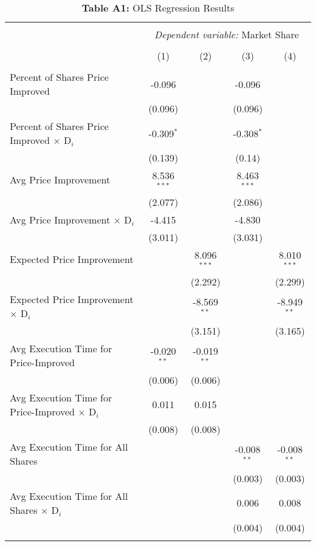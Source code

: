 \documentclass[12pt,a4paper]{extarticle}
\begin{document}
\begin{table}[h] 
	\caption*{\textbf{Table A1:} OLS Regression Results}
	\label{table:a1} 
	\centering
	\footnotesize
	\begin{tabular}{@{\extracolsep{1.39em}}lcccc} 
		\\[-4ex]\hline 
		\hline \\[-2ex] 
		& \multicolumn{4}{c}{\textit{Dependent variable: }Market Share} \\ 
		\cline{2-5} \\[-2ex]
		& (1) & (2) & (3) & (4) \\[.4ex]  
		\hline \\[-1.8ex] 
		Percent of Shares Price Improved & -0.096 &  & -0.096 & \\
		& (0.096) &  & (0.096) & \\ [0.5ex]
		Percent of Shares Price Improved $\times$ D$_i$ & -0.309$^{*}$ &  & -0.308$^{*}$ & \\
		& (0.139) &  & (0.14) & \\ [0.5ex]
		Avg Price Improvement & 8.536$^{***}$ &  & 8.463$^{***}$ & \\
		& (2.077) &  & (2.086) & \\ [0.5ex]
		Avg Price Improvement $\times$ D$_i$ & -4.415 &  & -4.830 & \\
		& (3.011) &  & (3.031) & \\ [0.5ex]
		Expected Price Improvement &  & 8.096$^{***}$ &  & 8.010$^{***}$\\
		&  & (2.292) &  & (2.299)\\ [0.5ex]
		Expected Price Improvement $\times$ D$_i$  &  & -8.569$^{**}$ &  & -8.949$^{**}$\\
		&  & (3.151) &  & (3.165)\\ [0.5ex]
		Avg Execution Time for Price-Improved & -0.020$^{**}$ & -0.019$^{**}$ &  & \\
		& (0.006) & (0.006) &  & \\ [0.5ex]
		Avg Execution Time for Price-Improved  $\times$ D$_i$  & 0.011 & 0.015 &  & \\
		& (0.008) & (0.008) &  & \\ [0.5ex]
		Avg Execution Time for All Shares &  &  & -0.008$^{**}$ & -0.008$^{**}$\\
		&  &  & (0.003) & (0.003)\\ [0.5ex]
		Avg Execution Time for All Shares  $\times$ D$_i$  &  &  & 0.006 & 0.008\\
		&  &  & (0.004) & (0.004)\\ [0.5ex]
		\hline \\[-1.8ex] 

\end{tabular}
\end{table}
\end{document}
